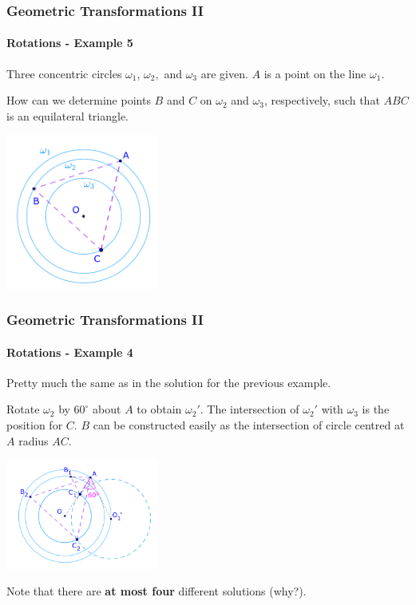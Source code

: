 \documentclass[8pt,xcolor=table,dvipsnames]{beamer}
\newcommand{\dg}{^\circ}
\begin{document}
\begin{frame}[t]
    \frametitle{Geometric Transformations II}
    \framesubtitle{Rotations - Example 5}
    \begin{example}
        Three concentric circles $\omega_1$, $\omega_2,$ and $\omega_3$ are given. $A$ is a point on the line $\omega_1$.
        
        \bigbreak
        How can we determine points $B$ and $C$ on $\omega_2$ and $\omega_3$, respectively, such that $ABC$ is an equilateral triangle.
    \end{example}

    \begin{center}
        \includegraphics[width=5cm]{./svg/pdf/rotation-5a.pdf}
    \end{center}
\end{frame}

\begin{frame}[t]
    \frametitle{Geometric Transformations II}
    \framesubtitle{Rotations - Example 4}
    Pretty much the same as in the solution for the previous example.
    
    \bigbreak
    Rotate $\omega_2$ by $60\dg$ about $A$ to obtain $\omega_2'$.
    The intersection of $\omega_2'$ with $\omega_3$ is the position for $C.$
    $B$ can be constructed easily as the intersection of circle centred at $A$ radius $AC.$
    \begin{center}
        \includegraphics[width=5cm]{./svg/pdf/rotation-5b.pdf}
    \end{center}

    \bigbreak
    Note that there are \textbf{at most four} different solutions (why?).
\end{frame}
\end{document}
